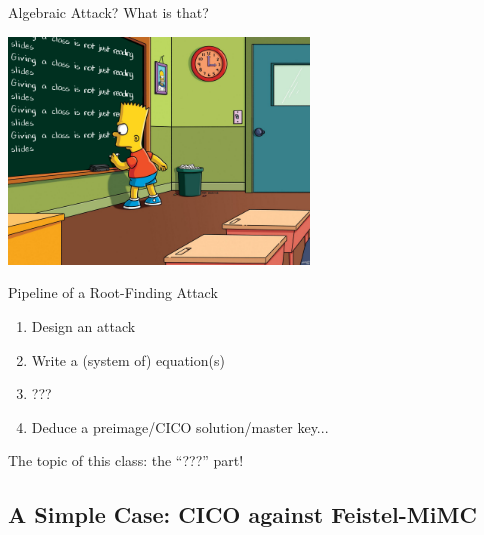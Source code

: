 \documentclass[aspectratio=169]{beamer}
\begin{document}
\begin{frame}{Algebraic Attack? What is that?}
  \vfill

  \begin{center}
    \includegraphics[width=8cm]{./figures/simpsons}
  \end{center}
  
  \vfill
\end{frame}


\begin{frame}{Pipeline of a Root-Finding Attack}

  \begin{enumerate}
    \setlength\itemsep{0.4cm}
  \item Design an attack \pause
  \item Write a (system of) equation(s) \pause
  \item \alert{???} \pause
  \item Deduce a preimage/CICO solution/master key...
  \end{enumerate}

  \pause\vspace{0.4cm}

  \begin{center}
    { \large
      The topic of this class: the ``\alert{???}'' part!
    }      
  \end{center}
\end{frame}



\subsection{A Simple Case: CICO against Feistel-MiMC}
\end{document}
